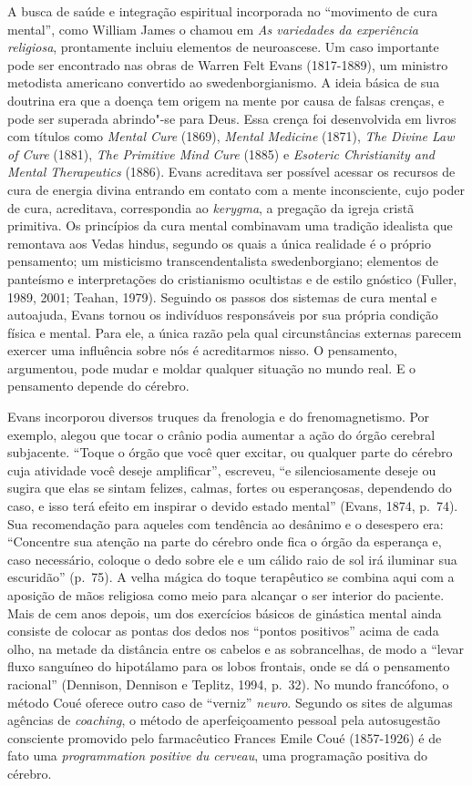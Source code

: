 A busca de saúde e integração espiritual incorporada no ``movimento de
cura mental'', como William James o chamou em \emph{As variedades da
experiência religiosa}, prontamente incluiu elementos de neuroascese. Um
caso importante pode ser encontrado nas obras de Warren Felt Evans
(1817-1889), um ministro metodista americano convertido ao
swedenborgianismo. A ideia básica de sua doutrina era que a doença tem
origem na mente por causa de falsas crenças, e pode ser superada
abrindo"-se para Deus. Essa crença foi desenvolvida em livros com títulos como
\emph{Mental Cure} (1869), \emph{Mental Medicine} (1871), \emph{The
Divine Law of Cure} (1881), \emph{The Primitive Mind Cure} (1885) e
\emph{Esoteric Christianity and} \emph{Mental Therapeutics} (1886).
Evans acreditava ser possível acessar os recursos de cura de energia
divina entrando em contato com a mente inconsciente, cujo poder de cura,
acreditava, correspondia ao \emph{kerygma}, a pregação da igreja
cristã primitiva. Os princípios da cura mental combinavam uma tradição
idealista que remontava aos Vedas hindus, segundo os quais a única
realidade é o próprio pensamento; um misticismo transcendentalista
swedenborgiano; elementos de panteísmo e interpretações do cristianismo
ocultistas e de estilo gnóstico (Fuller, 1989, 2001; Teahan, 1979).
Seguindo os passos dos sistemas de cura mental e autoajuda, Evans tornou
os indivíduos responsáveis por sua própria condição física e mental.
Para ele, a única razão pela qual circunstâncias
externas parecem exercer uma influência sobre nós é acreditarmos nisso.
O pensamento, argumentou, pode mudar e moldar qualquer situação no mundo
real. E o pensamento depende do cérebro.

Evans incorporou diversos truques da frenologia e do frenomagnetismo.
Por exemplo, alegou que tocar o crânio podia aumentar a ação do órgão
cerebral subjacente. ``Toque o órgão que você quer excitar, ou qualquer
parte do cérebro cuja atividade você deseje amplificar'', escreveu, ``e
silenciosamente deseje ou sugira que elas se sintam felizes, calmas,
fortes ou esperançosas, dependendo do caso, e isso terá efeito em
inspirar o devido estado mental'' (Evans, 1874, p.~74). Sua recomendação
para aqueles com tendência ao desânimo e o desespero era:
``Concentre sua atenção na parte do cérebro onde fica o órgão da
esperança e, caso necessário, coloque o dedo sobre ele e um cálido raio
de sol irá iluminar sua escuridão'' (p.~75). A velha mágica do toque
terapêutico se combina aqui com a aposição de mãos religiosa como meio
para alcançar o ser interior do paciente. Mais de cem anos depois, um
dos exercícios básicos de ginástica mental ainda consiste de colocar as
pontas dos dedos nos ``pontos positivos'' acima de cada olho, na metade
da distância entre os cabelos e as sobrancelhas, de modo a ``levar fluxo
sanguíneo do hipotálamo para os lobos frontais, onde se dá o pensamento
racional'' (Dennison, Dennison e Teplitz, 1994, p.~32). No mundo
francófono, o método Coué oferece outro caso de ``verniz'' \emph{neuro}.
Segundo os sites de algumas agências de \emph{coaching}, o
método de aperfeiçoamento pessoal pela autosugestão consciente promovido
pelo farmacêutico Frances Emile Coué (1857-1926) é de fato uma
\emph{programmation positive du cerveau}, uma programação positiva do
cérebro.

